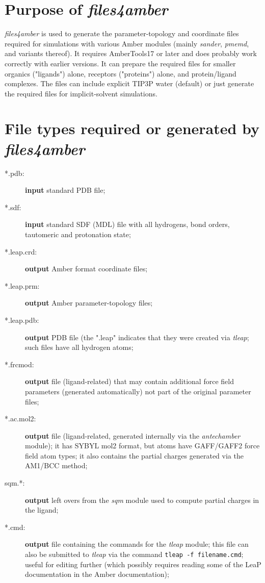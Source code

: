 \documentclass[10pt,landscape,twocolumn]{article}
\begin{document}
\section{Purpose of \textbf{\textsl{files4amber}}}
\textsl{files4amber} is used to generate the parameter-topology and coordinate files required for simulations with various Amber modules (mainly \textsl{sander}, \textsl{pmemd}, and variants thereof). It requires AmberTools17 or later and does probably work correctly with earlier versions. It can prepare the required files for smaller organics ("ligands") alone, receptors ("proteins") alone, and protein/ligand complexes. The files can include explicit TIP3P water (default) or just generate the required files for implicit-solvent simulations.

\section{File types required or generated by \textsl{files4amber}}

\begin{description}
\item[*.pdb:] \textbf{input} standard PDB file;
\item[*.sdf:] \textbf{input} standard SDF (MDL) file with all hydrogens, bond orders, tautomeric and protonation state;
\item[*.leap.crd:] \textbf{output} Amber format coordinate files;
\item[*.leap.prm:] \textbf{output} Amber parameter-topology files;
\item[*.leap.pdb:] \textbf{output} PDB file (the ".leap" indicates that they were created via \textsl{tleap}; such files  have all hydrogen atoms;
\item[*.frcmod:] \textbf{output} file (ligand-related) that may contain additional force field parameters (generated automatically) not part of the original parameter files;
\item[*.ac.mol2:] \textbf{output} file (ligand-related, generated internally via the \textsl{antechamber} module); it has SYBYL mol2 format, but atoms have GAFF/GAFF2 force field atom types; it also contains the partial charges generated via the AM1/BCC method;
\item[sqm.*:] \textbf{output} left overs from the \textsl{sqm} module used to compute partial charges in the ligand;
\item[*.cmd:] \textbf{output} file containing the commands for the \textsl{tleap} module; this file can also be submitted to \textsl{tleap} via the command \texttt{tleap -f filename.cmd}; useful for editing further (which possibly requires  reading some of the LeaP documentation in the Amber documentation);
\end{description}
\end{document}

